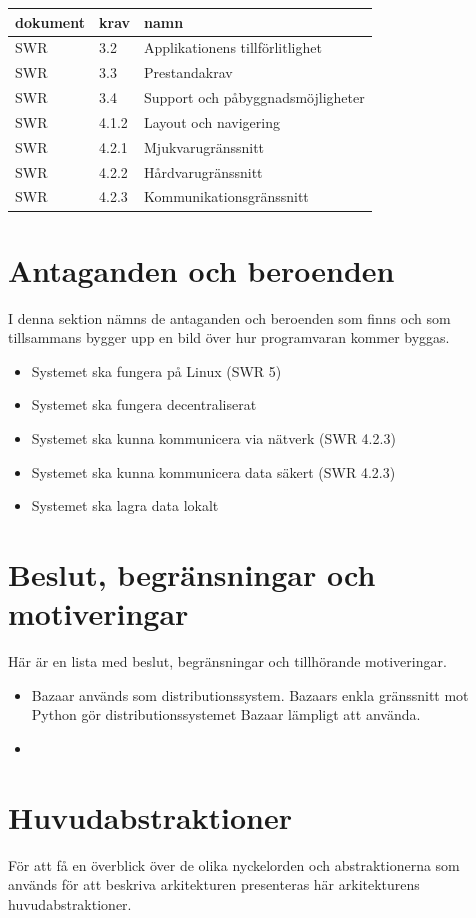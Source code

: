 \vspace{10pt}
\begin{tabularx}{\textwidth}{ |l|l|X| }
  \hline
    \textbf{dokument} & \textbf{krav} & \textbf{namn} \\
    \hline
    SWR & 3.2 & Applikationens tillförlitlighet \\
    SWR & 3.3 & Prestandakrav \\
    SWR & 3.4 & Support och påbyggnadsmöjligheter \\
    SWR & 4.1.2 & Layout och navigering \\
    SWR & 4.2.1 & Mjukvarugränssnitt \\
    SWR & 4.2.2 & Hårdvarugränssnitt \\
    SWR & 4.2.3 & Kommunikationsgränssnitt \\
    \hline
\end{tabularx}

\section{Antaganden och beroenden}
I denna sektion nämns de antaganden och beroenden som finns och som tillsammans bygger upp en bild över hur programvaran kommer byggas.
\begin{itemize}
\item Systemet ska fungera på Linux (SWR 5)
\item Systemet ska fungera decentraliserat
\item Systemet ska kunna kommunicera via nätverk (SWR 4.2.3)
\item Systemet ska kunna kommunicera data säkert (SWR 4.2.3)
\item Systemet ska lagra data lokalt
\end{itemize}
\section{Beslut, begränsningar och motiveringar}
Här är en lista med beslut, begränsningar och tillhörande motiveringar.
\begin{itemize}
\item Bazaar används som distributionssystem. Bazaars enkla gränssnitt mot Python gör distributionssystemet Bazaar lämpligt att använda.
\item 
\end{itemize}
\section{Huvudabstraktioner}
För att få en överblick över de olika nyckelorden och abstraktionerna som används för att beskriva arkitekturen presenteras här arkitekturens huvudabstraktioner.
